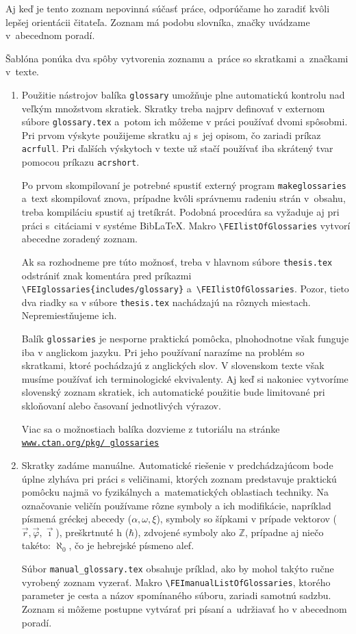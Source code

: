 \documentclass[../../../thesis.tex]{subfiles}
\begin{document}
Aj keď je tento zoznam nepovinná súčasť práce,
odporúčame ho zaradiť kvôli lepšej orientácii čitateľa.
Zoznam má podobu slovníka,
značky uvádzame v~abecednom poradí.

Šablóna ponúka dva spôby vytvorenia zoznamu a~práce so skratkami a~značkami v~texte.
\begin{enumerate}
\item Použitie nástrojov balíka \verb|glossary| umožňuje plne automatickú kontrolu nad veľkým množstvom skratiek. Skratky treba najprv definovať v externom súbore \verb|glossary.tex| a~potom ich môžeme v práci používať dvomi spôsobmi. Pri prvom výskyte použijeme skratku aj s~jej opisom, čo zariadi príkaz \verb|acrfull|.
Pri ďalších výskytoch v texte už stačí používať iba skrátený tvar pomocou príkazu \verb|acrshort|.

Po prvom skompilovaní je potrebné spustiť externý program \verb|makeglossaries| a~text skompilovať znova, prípadne kvôli správnemu radeniu strán v~obsahu, treba kompiláciu spustiť aj tretíkrát.
Podobná procedúra sa vyžaduje aj pri práci s~citáciami v systéme Bib\LaTeX.
Makro \verb|\FEIlistOfGlossaries| vytvorí abecedne zoradený zoznam.

Ak sa rozhodneme pre túto možnosť,
treba v hlavnom súbore \verb|thesis.tex| odstrániť
znak komentára pred príkazmi
\verb|\FEIglossaries{includes/glossary}|
a~\verb|\FEIlistOfGlossaries|. Pozor, tieto dva
riadky sa v súbore \verb|thesis.tex|
nachádzajú na rôznych miestach.
Nepremiestňujeme ich.

Balík \verb|glossaries| je nesporne praktická pomôcka, plnohodnotne však funguje iba v anglickom jazyku.
Pri jeho používaní narazíme na problém so skratkami, ktoré pochádzajú z anglických slov.
V slovenskom texte však musíme používať ich terminologické ekvivalenty.
Aj keď si nakoniec vytvoríme slovenský zoznam skratiek, ich automatické použitie bude limitované pri skloňovaní alebo časovaní jednotlivých výrazov.

Viac sa o možnostiach balíka dozvieme z tutoriálu na stránke \href{https://www.ctan.org/pkg/glossaries}{\texttt{www.ctan.org/pkg/ glossaries}}

\item Skratky zadáme manuálne.
Automatické riešenie v predchádzajúcom bode úplne zlyháva pri práci s veličinami, ktorých zoznam predstavuje praktickú pomôcku najmä vo fyzikálnych a~matematických oblastiach techniky. Na označovanie veličín používame rôzne symboly a ich modifikácie, napríklad písmená gréckej abecedy ($\alpha, \omega, \xi$), symboly so šípkami v prípade vektorov ($\vec r, \vec\varphi, \vec\imath$), preškrtnuté h ($\hbar$), zdvojené symboly ako $\mathbb Z$, prípadne aj niečo takéto: $\aleph_0$, čo je hebrejské písmeno alef.

Súbor \verb|manual_glossary.tex| obsahuje príklad, ako by mohol takýto ručne vyrobený zoznam vyzerať.
Makro
\verb|\FEImanualListOfGlossaries|, ktorého parameter je cesta a názov spomínaného súboru, zariadi samotnú sadzbu.
Zoznam si môžeme postupne vytvárať pri písaní a~udržiavať ho v abecednom poradí.
\end{enumerate}
\end{document}
